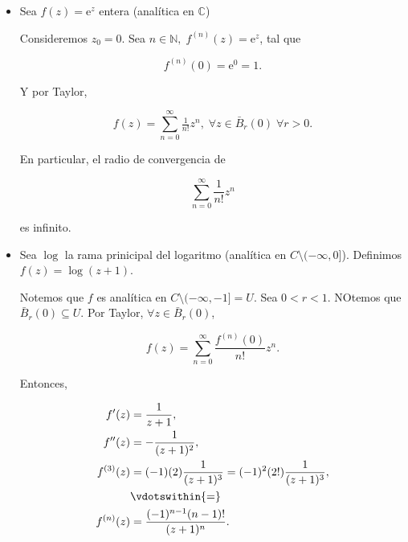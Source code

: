 \documentclass[../main.tex]{subfiles}
\begin{document}

\begin{example}
    \begin{itemize}
        \item Sea \(f(z) = \mathrm{e}^{z}\) entera (analítica en
            \(\mathbb{C}\))

            Consideremos \(z_{0} = 0\). Sea \(n\in \mathbb{N},\; f^{(n)}(z) =
            \mathrm{e}^{z}\),
            tal que

            \begin{equation*}
                f^{(n)}(0) = \mathrm{e}^{0} = 1.
            \end{equation*}

            Y por Taylor,

            \begin{equation*}
                f(z) = \sum_{n = 0}^{\infty}\tfrac{1}{n!}z^{n},\; \forall z\in
                \bar{B}_{r}(0)\; \forall r > 0.
            \end{equation*}

            En particular, el radio de convergencia de

            \begin{equation*}
                \sum_{n = 0}^{\infty}\dfrac{1}{n!}z^{n}
            \end{equation*}

            es infinito.

        \item Sea \(\log\) la rama prinicipal del logaritmo (analítica en
                \(C\setminus (-\infty,
            0]\)). Definimos \(f(z) = \log(z + 1)\).

            Notemos que \(f\) es analítica en \(C\setminus (-\infty,
            -1] = U\). Sea \(0 < r < 1\). NOtemos que \(\bar{B}_{r}(0)
            \subseteq U\). Por Taylor,
            \(\forall z\in \bar{B}_{r}(0)\),

            \begin{equation*}
                f(z) = \sum_{n = 0}^{\infty}\dfrac{f^{(n)}(0)}{n!}z^{n}.
            \end{equation*}

            Entonces,

            \begin{align*}
                f^{\prime}(z) &= \dfrac{1}{z + 1},\\
                f^{\prime\prime}(z) &= - \dfrac{1}{(z + 1)^{2}},\\
                f^{(3)}(z) &= (-1)(2)\dfrac{1}{(z + 1)^{3}} =
                (-1)^{2}(2!)\dfrac{1}{(z + 1)^{3}},\\
                &\vdotswithin{ = }\\
                f^{(n)}(z) &= \dfrac{(-1)^{n - 1}(n - 1)!}{(z + 1)^{n}}.
            \end{align*}


\end{itemize}
\end{example}
\end{document}
